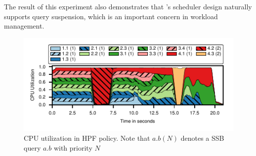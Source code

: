 The result of this experiment also demonstrates that \sys{}'s scheduler design naturally supports query suspension, which is an important concern in workload management. 

\begin{figure}[t]
	\centering
	\includegraphics[width=\columnwidth]{figures/ssb-hpf-all.pdf}
	\vspace{-2.5em}
	\caption{CPU utilization in HPF policy. Note that $a.b  (N)$ denotes a SSB query $a.b$ with priority $N$}
	\vspace{-1em}
	\label{fig:hpf-all}
\end{figure}

